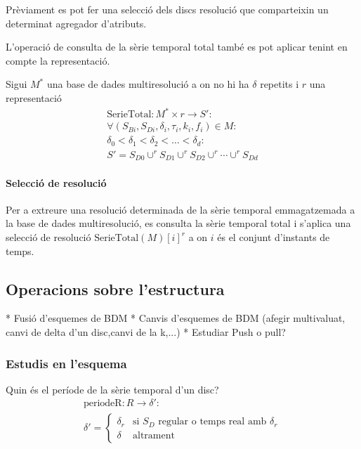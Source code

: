 Prèviament es pot fer una selecció dels discs resolució que
comparteixin un determinat agregador d'atributs. 



L'operació de consulta de la sèrie temporal total també es pot aplicar
tenint en compte la representació.
\begin{definition}
  Sigui $M^*$ una base de dades multiresolució a on no hi ha $\delta$
  repetits i $r$ una representació
  \begin{gather*}
    \text{SerieTotal}: M^* \times r \longrightarrow S': \\
    \forall (S_{Bi},S_{Di},\delta_i,\tau_i,k_i,f_i) \in M : \\
    \delta_0 < \delta_1 < \delta_2 < \dots < \delta_d : \\
    S' = S_{D0} \cup^r S_{D1} \cup^r  S_{D2}  \cup^r \dotsb \cup^r  S_{Dd}
\end{gather*}
\end{definition}



\paragraph{Selecció de resolució}


Per a extreure una resolució determinada de la sèrie temporal
emmagatzemada a la base de dades multiresolució, es consulta la sèrie
temporal total i s'aplica una selecció de resolució
$\text{SerieTotal}(M)[i]^r$ a on $i$ és el conjunt d'instants de
temps.






\subsection{Operacions sobre l'estructura}

* Fusió d'esquemes de BDM
* Canvis d'esquemes de BDM (afegir multivaluat, canvi de delta d'un disc,canvi de la k,...)
* Estudiar Push o pull?




\subsubsection{Estudis en l'esquema}

Quin és el període de la sèrie temporal d'un disc?
  \begin{gather*}
    \text{periodeR}: R \longrightarrow \delta':\\
    \delta'=
    \begin{cases}
      \delta_r &\text{si } S_D \text{ regular o temps real amb } \delta_r\\
      \delta &\text{altrament}
    \end{cases}
  \end{gather*}
  
